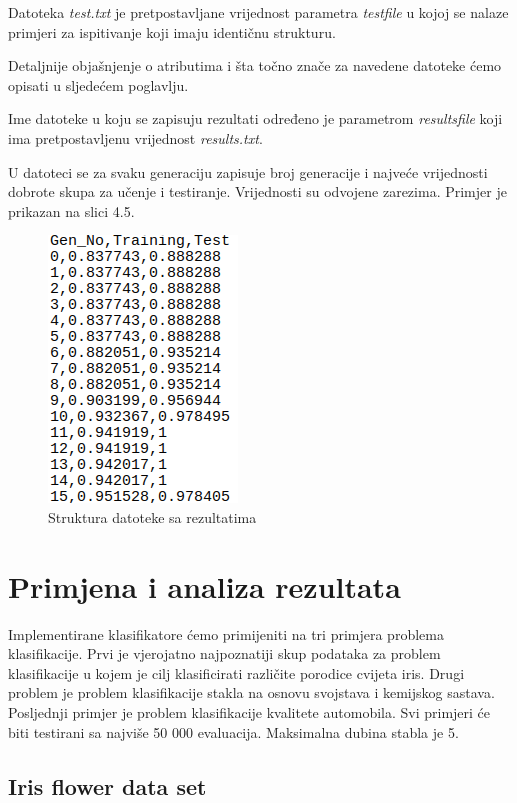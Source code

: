 \documentclass[times, utf8, zavrsni]{fer}
\begin{document}
Datoteka \textit{test.txt} je pretpostavljane vrijednost parametra \textit{testfile} u kojoj se nalaze primjeri za ispitivanje koji imaju identičnu strukturu.

Detaljnije objašnjenje o atributima i šta točno znače za navedene datoteke ćemo opisati u sljedećem poglavlju.

Ime datoteke u koju se zapisuju rezultati određeno je parametrom \textit{resultsfile} koji ima pretpostavljenu vrijednost \textit{results.txt}.

U datoteci se za svaku generaciju zapisuje broj generacije i najveće vrijednosti dobrote skupa za učenje i testiranje. Vrijednosti su odvojene zarezima. Primjer je prikazan na slici 4.5.

\begin{figure}[htb]
\centering
\includegraphics[scale=0.5]{images/rezultati}
\caption{Struktura datoteke sa rezultatima}
\end{figure}



\chapter{Primjena i analiza rezultata}

Implementirane klasifikatore ćemo primijeniti na tri primjera problema klasifikacije. Prvi je vjerojatno najpoznatiji skup podataka za problem klasifikacije u kojem je cilj klasificirati različite porodice cvijeta iris. Drugi problem je problem klasifikacije stakla na osnovu svojstava i kemijskog sastava. Posljednji primjer je problem klasifikacije kvalitete automobila. Svi primjeri će biti testirani sa najviše 50 000 evaluacija. Maksimalna dubina stabla je 5.

\section{Iris flower data set}
\end{document}
